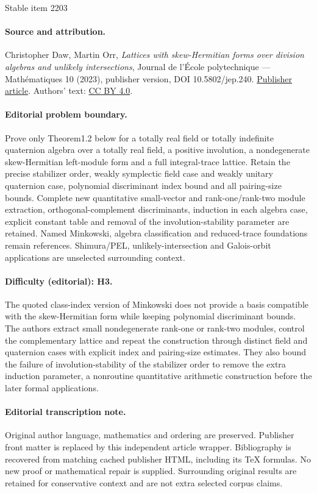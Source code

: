 \documentclass[11pt]{article}
\numberwithin{equation}{section}
\begin{document}
\begin{center}{\Large Stable item 2203}\end{center}
\paragraph{Source and attribution.}
Christopher Daw, Martin Orr, \emph{Lattices with skew-Hermitian forms over division algebras and unlikely intersections}, Journal de l’École polytechnique — Mathématiques 10 (2023), publisher version, DOI 10.5802/jep.240. \href{https://jep.centre-mersenne.org/articles/10.5802/jep.240/}{Publisher article}. Authors' text: \href{https://creativecommons.org/licenses/by/4.0/}{CC BY 4.0}.
\paragraph{Editorial problem boundary.}
Prove only Theorem1.2 below for a totally real field or totally indefinite quaternion algebra over a totally real field, a positive involution, a nondegenerate skew-Hermitian left-module form and a full integral-trace lattice. Retain the precise stabilizer order, weakly symplectic field case and weakly unitary quaternion case, polynomial discriminant index bound and all pairing-size bounds. Complete new quantitative small-vector and rank-one/rank-two module extraction, orthogonal-complement discriminants, induction in each algebra case, explicit constant table and removal of the involution-stability parameter are retained. Named Minkowski, algebra classification and reduced-trace foundations remain references. Shimura/PEL, unlikely-intersection and Galois-orbit applications are unselected surrounding context.
\paragraph{Difficulty (editorial): H3.}
The quoted class-index version of Minkowski does not provide a basis compatible with the skew-Hermitian form while keeping polynomial discriminant bounds. The authors extract small nondegenerate rank-one or rank-two modules, control the complementary lattice and repeat the construction through distinct field and quaternion cases with explicit index and pairing-size estimates. They also bound the failure of involution-stability of the stabilizer order to remove the extra induction parameter, a nonroutine quantitative arithmetic construction before the later formal applications.
\paragraph{Editorial transcription note.}
Original author language, mathematics and ordering are preserved. Publisher front matter is replaced by this independent article wrapper. Bibliography is recovered from matching cached publisher HTML, including its TeX formulas. No new proof or mathematical repair is supplied. Surrounding original results are retained for conservative context and are not extra selected corpus claims.
\clearpage
\end{document}
